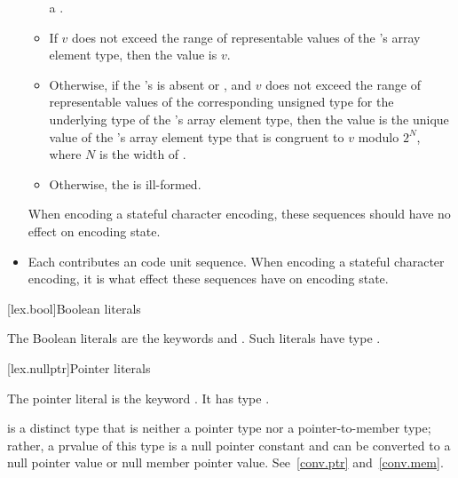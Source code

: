 \documentclass{wg21}
\begin{document}
\begin{itemize}
\begin{itemize}
        a .
        \item
        If $v$ does not exceed the range of representable values of
        the 's array element type,
        then the value is $v$.
        \item
        Otherwise,
        if the 's 
        is absent or , and
        $v$ does not exceed the range of representable values of
        the corresponding unsigned type for the underlying type of
        the 's array element type,
        then the value is the unique value of
        the 's array element type 
        that is congruent to $v$ modulo $2^N$, where $N$ is the width of .
        \item
        Otherwise, the  is ill-formed.
    \end{itemize}
    When encoding a stateful character encoding,
    these sequences should have no effect on encoding state.
    \item
    Each 
    contributes an
    code unit sequence.
    When encoding a stateful character encoding,
    it is
    what effect these sequences have on encoding state.
\end{itemize}

[lex.bool]{Boolean literals}

%
\begin{bnf}
    \br
    \br
\end{bnf}

\pnum
{}%
The Boolean literals are the keywords  and .
Such literals have type .

[lex.nullptr]{Pointer literals}

%
\begin{bnf}
    \br
\end{bnf}

\pnum
The pointer literal is the keyword . It has type
.
\begin{note}
     is a distinct type that is neither a pointer type nor a pointer-to-member type;
    rather, a prvalue of this type is a null pointer constant and can be
    converted to a null pointer value or null member pointer value. See~\ref{conv.ptr}
    and~\ref{conv.mem}.
\end{note}
\end{document}
